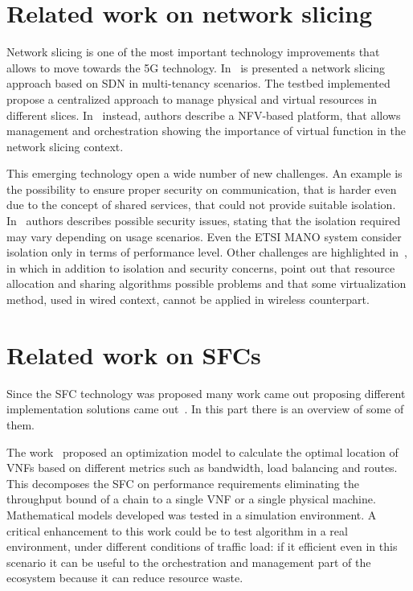 \section{Related work on network slicing}
Network slicing is one of the most important technology improvements that allows
to move towards the 5G technology. In~\cite{chartsias2017sdn} is presented a
network slicing approach based on SDN in multi-tenancy scenarios. The testbed
implemented propose a centralized approach to manage physical and virtual
resources in different slices. In~\cite{peuster2016medicine} instead, authors
describe a NFV-based platform, that allows management and orchestration showing
the importance of virtual function in the network slicing context.

This emerging technology open a wide number of new challenges. An example is the
possibility to ensure proper security on communication, that is harder even due
to the concept of shared services, that could not provide suitable isolation. 
In~\cite{kotulski2017end} authors describes possible security issues, stating
that the isolation required may vary depending on usage scenarios. Even the ETSI
MANO system consider isolation only in terms of performance level. Other
challenges are highlighted in~\cite{li2017network}, in which in addition to
isolation and security concerns, point out that resource allocation and
sharing algorithms possible problems and that some virtualization method, used
in wired context, cannot be applied in wireless counterpart.

\section{Related work on SFCs}

Since the SFC technology was proposed many work came out proposing different
implementation solutions came out~\cite{medhat2017service}. In this part there
is an overview of some of them.

The work~\cite{GhaznaviSAB16} proposed an optimization model to calculate the
optimal location of VNFs based on different metrics such as bandwidth, load
balancing and routes. This decomposes the SFC on performance requirements
eliminating the throughput bound of a chain to a single VNF or a single physical
machine. Mathematical models developed was tested in a simulation environment. A
critical enhancement to this work could be to test algorithm in a real
environment, under different conditions of traffic load: if it efficient even in
this scenario it can be useful to the orchestration and management part of the
ecosystem because it can reduce resource waste.

